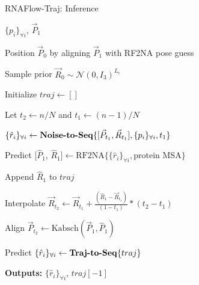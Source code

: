 \begin{algorithm}[h]
\caption{RNAFlow-Traj: Inference}\label{rnaflow:inference}

\algorithmicrequire $\{p_i\}_{\forall i}$, $\vec P_1$
\vspace{0.25em}

Position $\vec P_0$ by aligning $\vec P_1$ with RF2NA pose guess
\vspace{0.25em}

Sample prior  $\vec R_0 \sim \mathcal{N}(0, I_3)^{L_r}$
\vspace{0.25em}

Initialize $traj \gets []$
\vspace{0.25em}

\vspace{0.25em}

    \hspace{0.2in} Let $t_2 \gets n/N$ and $t_1 \gets (n-1)/N$
    \vspace{0.25em}
    
    \hspace{0.2in} $\{\hat r_i\}_{\forall i} \gets \text{\textbf{Noise-to-Seq}} \{ [\vec P_{t_1}, \vec R_{t_1}], \{p_i\}_{\forall i}, t_1 \}$
    \vspace{0.25em}
    
    \hspace{0.2in} Predict [$\hat P_1$, $\hat R_1] \gets \text{RF2NA} \{ \{\hat r_i\}_{\forall i}, \text{protein MSA} \}$
    \vspace{0.25em}
    
    \hspace{0.2in} Append $\hat R_1$ to $traj$
    \vspace{0.25em}
    
    \hspace{0.2in} Interpolate $\vec R_{t_2} \gets \vec R_{t_1} +  \frac{(\hat R_{1} - \vec R_{t_1})}{(1 - t_1)} * (t_2 - t_1)$
    
    \hspace{0.2in} Align $\vec P_{t_2} \gets \text{Kabsch}(\vec P_1, \hat P_1)$
    
\algorithmicendfor

Predict $\{\hat r_i\}_{\forall i} \gets \text{\textbf{Traj-to-Seq}} \{ traj \}$
\vspace{0.25em}

\textbf{Outputs:} $\{\hat r_i\}_{\forall i}$, $traj[-1]$

\end{algorithm}


